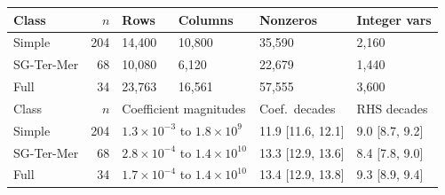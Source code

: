 \begin{tabular}{lrllll}
\toprule
Class & $n$ & Rows & Columns & Nonzeros & Integer vars \\
\midrule
Simple & 204 & 14,400 & 10,800 & 35,590 & 2,160 \\
SG-Ter-Mer & 68 & 10,080 & 6,120 & 22,679 & 1,440 \\
Full & 34 & 23,763 & 16,561 & 57,555 & 3,600 \\
\midrule
Class & $n$ & \multicolumn{2}{l}{Coefficient magnitudes} & Coef.\ decades & RHS decades \\
\midrule
Simple & 204 & \multicolumn{2}{l}{$1.3\times10^{-3}$ to $1.8\times10^{9}$} & 11.9 [11.6, 12.1] & 9.0 [8.7, 9.2] \\
SG-Ter-Mer & 68 & \multicolumn{2}{l}{$2.8\times10^{-4}$ to $1.4\times10^{10}$} & 13.3 [12.9, 13.6] & 8.4 [7.8, 9.0] \\
Full & 34 & \multicolumn{2}{l}{$1.7\times10^{-4}$ to $1.4\times10^{10}$} & 13.4 [12.9, 13.8] & 9.3 [8.9, 9.4] \\
\bottomrule
\end{tabular}
